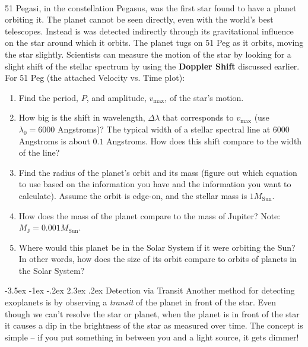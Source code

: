 \documentclass[12pt]{article}
\makeatletter
\renewcommand\section{\@startsection{section}{1}{\z@}%
                                  {-3.5ex \@plus -1ex \@minus -.2ex}%
                                  {2.3ex \@plus.2ex}%
                                  {\normalfont\large\bfseries}}
\makeatother
\begin{document}
\paragraph{}
51 Pegasi, in the constellation Pegasus, was the first star found to
have a planet orbiting it. The planet cannot be seen directly, even
with the world's best telescopes. Instead is was detected indirectly
through its gravitational influence on the star around which it
orbits. The planet tugs on 51 Peg as it orbits, moving the star
slightly. Scientists can measure the motion of the star by looking for
a slight shift of the stellar spectrum by using the \textbf{Doppler Shift} discussed earlier. \\
\vspace{10 pt}
For 51 Peg (the attached Velocity vs. Time plot):
\begin{enumerate}
\item Find the period, $P$, and amplitude, $v_\mathrm{max}$, of
  the star's motion.

\item How big is the shift in wavelength, $\Delta \lambda$ that
  corresponds to $v_\mathrm{max}$ (use $\lambda_0 = 6000$ Angstroms)?
  The typical width of a stellar spectral line at $6000$ Angstroms is
  about $0.1$ Angstroms. How does this shift compare to the width of
  the line? 

\item Find the radius of the planet's orbit and its mass (figure out
  which equation to use based on the information you have and the
  information you want to calculate). Assume the orbit is edge-on, and
  the stellar mass is $1 M_\mathrm{Sun}$.

\item How does the mass of the planet compare to the mass of Jupiter?
  Note: $M_\mathrm{J} = 0.001 M_\mathrm{Sun}$.

\item Where would this planet be in the Solar System if it were
  orbiting the Sun? In other words, how does the size of its orbit
  compare to orbits of planets in the Solar System?
\end{enumerate}

\section{Detection via Transit}
Another method for detecting exoplanets is by observing a \textit{transit} of the planet in front of the star. Even though we can't resolve the star or planet, when the planet is in front of the star it causes a dip in the brightness of the star as measured over time. The concept is simple -- if you put something in between you and a light source, it gets dimmer!
\end{document}
